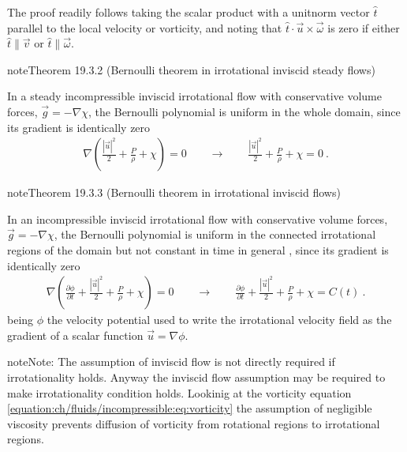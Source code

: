 \documentclass[letterpaper,10pt,english]{jupyterBook}
\begin{document}
\sphinxAtStartPar
The proof readily follows taking the scalar product with a unit\sphinxhyphen{}norm vector \(\hat{t}\) parallel to the local velocity or vorticity, and noting that \(\hat{t} \cdot \vec{u} \times \vec{\omega}\) is zero if either \(\hat{t} \parallel \vec{v}\) or \(\hat{t} \parallel \vec{\omega}\).
\label{ch/fluids/incompressible:theorem-1}
\begin{sphinxadmonition}{note}{Theorem 19.3.2 (Bernoulli theorem in irrotational inviscid steady flows)}



\sphinxAtStartPar
In a steady incompressible inviscid irrotational flow with conservative volume forces, \(\vec{g} = - \nabla \chi\), the Bernoulli polynomial is uniform in the whole domain, since its gradient is identically zero
\begin{equation*}
\begin{split}\nabla \left( \frac{|\vec{u}|^2}{2} + \frac{P}{\rho} + \chi \right) = 0 
\qquad \rightarrow \qquad \frac{|\vec{u}|^2}{2} + \frac{P}{\rho} + \chi = 0 \ .\end{split}
\end{equation*}\end{sphinxadmonition}
\label{ch/fluids/incompressible:theorem-2}
\begin{sphinxadmonition}{note}{Theorem 19.3.3 (Bernoulli theorem in irrotational inviscid flows)}



\sphinxAtStartPar
In an incompressible inviscid irrotational flow with conservative volume forces, \(\vec{g} = - \nabla \chi\), the Bernoulli polynomial is uniform in the connected irrotational regions of the domain \sphinxhyphen{} but not constant in time in general \sphinxhyphen{} , since its gradient is identically zero
\begin{equation*}
\begin{split}\nabla \left( \frac{\partial \phi}{\partial t} + \frac{|\vec{u}|^2}{2} + \frac{P}{\rho} + \chi \right) = 0 
\qquad \rightarrow \qquad \frac{\partial \phi}{\partial t} + \frac{|\vec{u}|^2}{2} + \frac{P}{\rho} + \chi = C(t) \ .\end{split}
\end{equation*}
\sphinxAtStartPar
being \(\phi\) the velocity potential used to write the irrotational velocity field as the gradient of a scalar function \(\vec{u} = \nabla \phi\).
\end{sphinxadmonition}

\begin{sphinxadmonition}{note}{Note:}
\sphinxAtStartPar
The assumption of inviscid flow is not directly required if irrotationality holds. Anyway the inviscid flow assumption may be required to make irrotationality condition holds. Lookinig at the vorticity equation \eqref{equation:ch/fluids/incompressible:eq:vorticity} the assumption of negligible viscosity prevents diffusion of vorticity from rotational regions to irrotational regions.
\end{sphinxadmonition}
\end{document}
